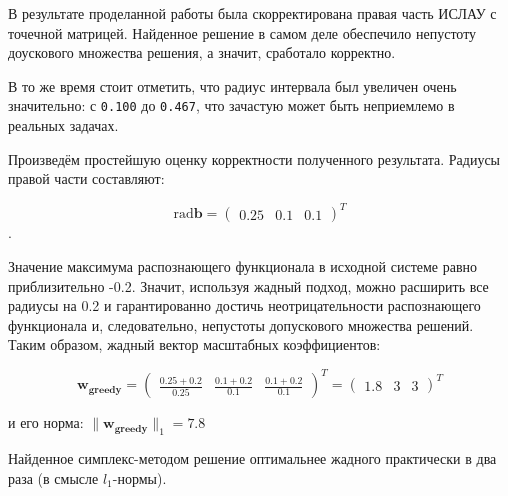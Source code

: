 В результате проделанной работы была скорректирована правая часть ИСЛАУ с точечной матрицей. Найденное решение в самом деле обеспечило непустоту доускового множества решения, а значит, сработало корректно.

В то же время стоит отметить, что радиус интервала был увеличен очень значительно: с \texttt{0.100} до \texttt{0.467}, что зачастую может быть неприемлемо в реальных задачах.

Произведём простейшую оценку корректности полученного результата.
Радиусы правой части составляют:

\begin{equation}
\textrm{rad} \mathbf{b}=
\begin{pmatrix}
0.25 & 0.1 & 0.1
\end{pmatrix}^T
\end{equation}.

Значение максимума распознающего функционала в исходной системе равно приблизительно -0.2. Значит, используя жадный подход, можно расширить все радиусы на 0.2 и гарантированно достичь неотрицательности распознающего функционала и, следовательно, непустоты допускового множества решений. Таким образом, жадный вектор масштабных коэффициентов:

\begin{equation}
\mathbf{w_{greedy}}=
\begin{pmatrix}
\frac{0.25 + 0.2}{0.25} & \frac{0.1 + 0.2}{0.1} & \frac{0.1 + 0.2}{0.1}
\end{pmatrix}^T
=
\begin{pmatrix}
1.8 & 3 & 3
\end{pmatrix}^T
\end{equation}

и его норма: $\|\mathbf{w_{greedy}}\|_1=7.8$

Найденное симплекс-методом решение оптимальнее жадного практически в два раза (в смысле $l_1$-нормы).